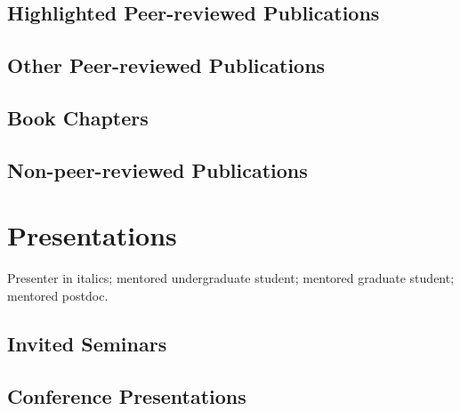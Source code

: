 
\subsection*{Highlighted Peer-reviewed Publications}
\nocite{*}
\printbibliography[filter=highlightedpapersnopreprints, heading=none]

\subsection*{Other Peer-reviewed Publications}
\nocite{*}
\printbibliography[filter=cvpapersnohighlightsnopreprints, heading=none]

\subsection*{Book Chapters}
\nocite{*}
\printbibliography[filter=bookchapters, heading=none]

\subsection*{Non-peer-reviewed Publications}


\section*{Presentations}
Presenter in italics;
\ugsymbol{}mentored undergraduate student;
\phdsymbol{}mentored graduate student;
\postdocsymbol{}mentored postdoc.

\subsection*{Invited Seminars}
\nocite{*}
\printbibliography[filter=invitedpresentation, heading=none]

\subsection*{Conference Presentations}
\nocite{*}
\printbibliography[filter=presentation, heading=none]

